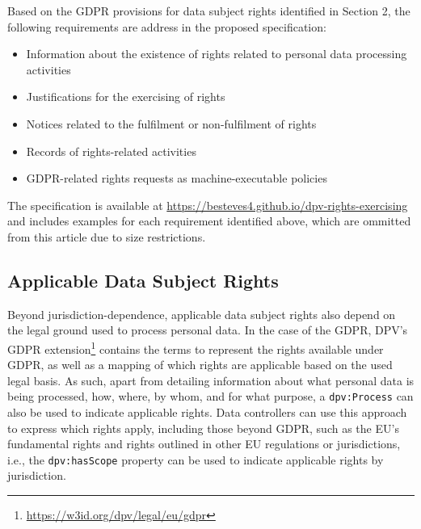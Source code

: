 \documentclass{IOS-Book-Article}     %
\begin{document}
Based on the GDPR provisions for data subject rights identified in Section 2, the following requirements are address in the proposed specification:

\begin{itemize}
    \item[\textbf{Section~\ref{sec:applicable-rights}}] Information about the existence of rights related to personal data processing activities
    \item[\textbf{Section~\ref{sec:justifications}}] Justifications for the exercising of rights
    \item[\textbf{Section~\ref{sec:notices}}] Notices related to the fulfilment or non-fulfilment of rights
    \item[\textbf{Section~\ref{sec:records}}] Records of rights-related activities
    \item[\textbf{Section~\ref{sec:policies}}] GDPR-related rights requests as machine-executable policies
\end{itemize}

The specification is available at \url{https://besteves4.github.io/dpv-rights-exercising} and includes examples for each requirement identified above, which are ommitted from this article due to size restrictions.

\subsection{Applicable Data Subject Rights}
\label{sec:applicable-rights}

Beyond jurisdiction-dependence, applicable data subject rights also depend on the legal ground used to process personal data.
In the case of the GDPR, DPV's GDPR extension\footnote{\url{https://w3id.org/dpv/legal/eu/gdpr}} contains the terms to represent the rights available under GDPR, as well as a mapping of which rights are applicable based on the used legal basis.
As such, apart from detailing information about what personal data is being processed, how, where, by whom, and for what purpose, a \texttt{dpv:Process} can also be used to indicate applicable rights.
Data controllers can use this approach to express which rights apply, including those beyond GDPR, such as the EU’s fundamental rights and rights outlined in other EU regulations or jurisdictions, i.e., the \texttt{dpv:hasScope} property can be used to indicate applicable rights by jurisdiction.
\end{document}
